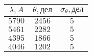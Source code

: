 \begin{tabular}{| c | c | c |}
  \hline
  $\lambda, A$ & $\theta, дел$ & $\sigma_{\theta}, дел$ \\
  \hline
  $5790$       & $2456$        & $5$                    \\
  \hline
  $5461$       & $2282$        & $5$                    \\
  \hline
  $4395$       & $1866$        & $5$                    \\
  \hline
  $4046$       & $1202$        & $5$                    \\
  \hline
\end{tabular}